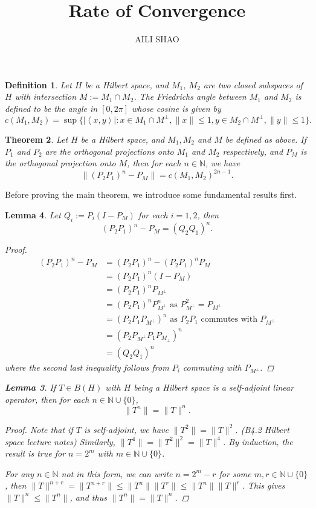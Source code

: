 \documentclass[11pt, a4paper]{amsart}
\newtheorem{theorem}{Theorem}
\newtheorem{lemma}[theorem]{Lemma}
\newtheorem{definition}[theorem]{Definition}
\begin{document}
\title{Rate of Convergence}
\author{AILI SHAO}
\maketitle
\hrulefill
\hrulefill
\hrulefill

\begin{definition}
Let $H$ be a Hilbert space, and $M_1$, $M_2$ are two closed subspaces of $H$ with intersection $M:=M_1\cap M_2$. The \emph{Friedrichs angle} between $M_1$ and $M_2$ is defined to be the angle in $[0,2\pi]$ whose cosine is given by
$$ c(M_1,M_2)=\sup\{|\left\langle x,y\right\rangle|\colon x\in M_{1}\cap M^{\perp}, \|x\|\leq 1, y\in M_2\cap M^{\perp},\|y\|\leq 1\}.$$
\end{definition}

\begin{theorem}\label{t1}
Let $H$ be a Hilbert space, and $M_1, M_2$ and $M$ be defined as above. If $P_1$ and $P_2$ are the orthogonal projections onto $M_1$ and $M_2$ respectively, and $P_M$ is the orthogonal projection onto $M$, then for each $n\in\mathbb{N}$, we have
$$\|(P_2P_1)^n-P_{M}\|=c(M_1,M_2)^{2n-1}.$$
\end{theorem}
Before proving the main theorem, we introduce some fundamental results first.
\begin{lemma}\label{l1}
Let $Q_i:=P_i(I-P_{M})$ for each $i=1,2$, then $$(P_2P_1)^n-P_M=(Q_2Q_1)^n.$$
\begin{proof}
\begin{align*}
(P_2P_1)^n-P_M &= (P_2P_1)^n-(P_2P_1)^n P_M\\
{}&=(P_2P_1)^n(I-P_M)\\
{}&=(P_2P_1)^n P_{M^{\perp}}\\
{}&=(P_2P_1)^n P_{M^{\perp}}^n  \mbox{ as } P_{M^{\perp}}^2=P_{M^{\perp}} \\
{}&= (P_2P_1 P_{M^{\perp}})^n   \mbox{ as } P_2P_1 \mbox{ commutes with } P_{M^{\perp}}\\
{}&=(P_2 P_{M^{\perp}} P_1 P_{M_{\perp}})^n\\
{}&=(Q_2Q_1)^n
\end{align*}
where the second last inequality follows from $P_i$ commuting with $P_{M^{\perp}}$.
\end{proof}
\begin{lemma}\label{l2}
If $T\in B(H)$ with $H$ being a Hilbert space is a self-adjoint linear operator, then for each $n\in\mathbb{N}\cup\{0\}$,
$$\|T^n\|=\|T\|^n.$$
\end{lemma}
\begin{proof}
Note that if $T$ is self-adjoint, we have $\|T^2\|=\|T\|^2$. (B4.2 Hilbert space lecture notes) 
Similarly, $\|T^4\|=\|T^2\|^2=\|T\|^4$. By induction, the result is true for $n=2^m$ with $m\in \mathbb{N}\cup\{0\}$.  

For any $n\in\mathbb{N}$ not in this form, we can write $n=2^m-r$ for some $m,r\in\mathbb{N}\cup\{0\}$, then 
$\|T\|^{n+r}=\|T^{n+r}\|\leq \|T^{n}\|\|T^r\|\leq\|T^n\|\|T\|^r$. This gives $\|T\|^n\leq \|T^n\|$, and thus $\|T^n\|=\|T\|^n$.
\end{proof}
\end{lemma} 
\end{document}
